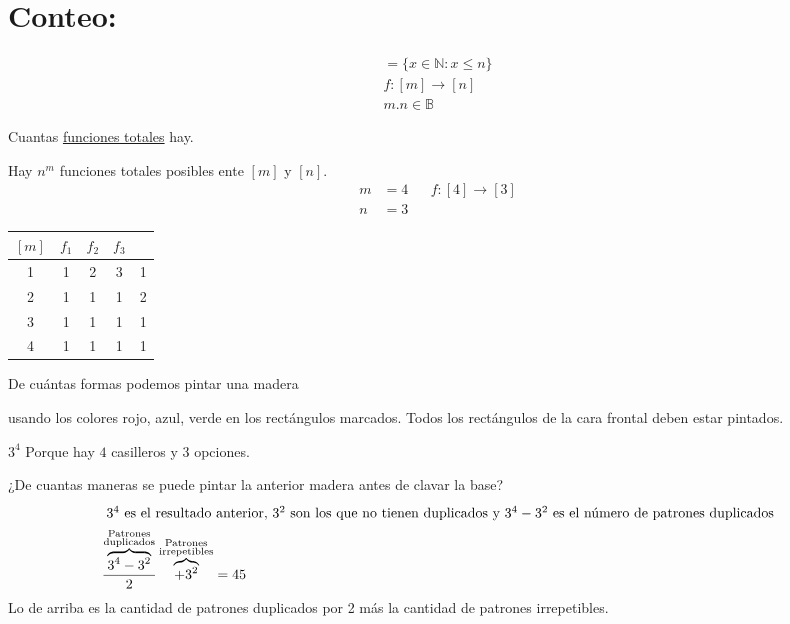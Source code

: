 \documentclass[12pt, twoside]{article}
\begin{document}
\maketitle
\thispagestyle{fancy}

\section{Conteo:}%
\label{sec:Conteo:}

\begin{align*}
	[n] = \{x\in\mathbb{N}:x\leq n\}\\
	f:[m]\longrightarrow[n]\\
	m.n\in\mathbb{B}
\end{align*}

Cuantas \underline{funciones totales} hay.



Hay $n^m$ funciones totales posibles ente $[m]$ y $[n]$.
\begin{align*}
	m &=4 && f:[4]\longrightarrow[3]\\
	n &=3
\end{align*}

\begin{center}
	\begin{tabular}{c|c|c|c|c}
		$[m]$ & $f_1$ & $f_2$ & $f_3$ & \\
		\hline
		1 & 1 & 2 & 3 & 1\\
		2 & 1 & 1 & 1 & 2\\
		3 & 1 & 1 & 1 & 1\\
		4 & 1 & 1 & 1 & 1\\
	\end{tabular}
\end{center}

De cuántas formas podemos pintar una madera
usando los colores rojo, azul, verde en los rectángulos marcados.
Todos los rectángulos de la cara frontal deben estar pintados.

$3^4$
Porque hay $4$ casilleros y $3$ opciones.

¿De cuantas maneras se puede pintar la anterior madera antes de clavar la base?
\begin{align*}
	\intertext{ $3^4$ es el resultado anterior, $3^2$ son los que no
	tienen duplicados y $3^4-3^2$ es el número de patrones duplicados}
	\frac{\overbrace{3^4-3^2 }^{\substack{\text{Patrones}\\\text{duplicados}} }}{2}
	\overbrace{+3^2}^{\substack{\text{Patrones}\\\text{irrepetibles}} } = 45
\end{align*}
Lo de arriba es la cantidad de patrones duplicados por 2 más la cantidad de patrones
irrepetibles.
\end{document}

